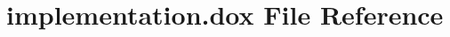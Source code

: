 \hypertarget{implementation_8dox}{
\section{implementation.dox File Reference}
\label{implementation_8dox}
}
